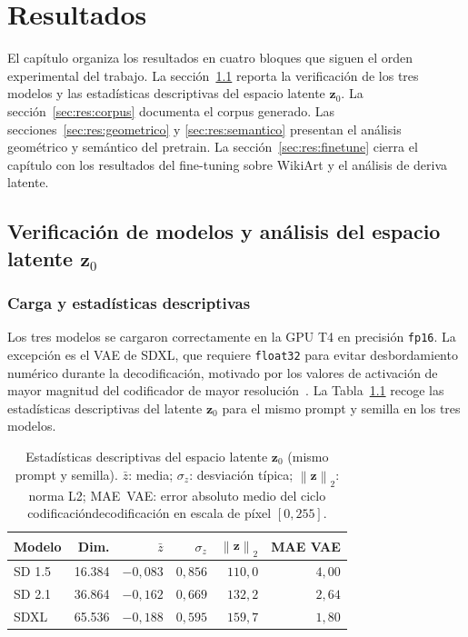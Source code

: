 \documentclass[12pt, a4paper, twoside]{book}
\newcommand{\z}{\mathbf{z}}
\newcommand{\norm}[1]{\left\|#1\right\|_2}
\begin{document}
\mainmatter

\chapter{Resultados}
\label{ch:resultados}

El capítulo organiza los resultados en cuatro bloques que siguen el orden experimental del trabajo.
La sección~\ref{sec:res:modelos} reporta la verificación de los tres modelos y las estadísticas
descriptivas del espacio latente $\z_0$. La sección~\ref{sec:res:corpus} documenta el corpus
generado. Las secciones~\ref{sec:res:geometrico} y \ref{sec:res:semantico} presentan el análisis
geométrico y semántico del pretrain. La sección~\ref{sec:res:finetune} cierra el capítulo con los
resultados del fine-tuning sobre WikiArt y el análisis de deriva latente.

\section{Verificación de modelos y análisis del espacio latente $\z_0$}
\label{sec:res:modelos}

\subsection{Carga y estadísticas descriptivas}

Los tres modelos se cargaron correctamente en la GPU T4 en precisión \texttt{fp16}.
La excepción es el VAE de SDXL, que requiere \texttt{float32} para evitar desbordamiento
numérico durante la decodificación, motivado por los valores de activación de mayor magnitud
del codificador de mayor resolución~\citep{podell2023sdxl}.
La Tabla~\ref{tab:estadisticas_z0} recoge las estadísticas descriptivas del latente $\z_0$
para el mismo prompt y semilla en los tres modelos.

\begin{table}[htb]
\centering
\caption{Estadísticas descriptivas del espacio latente $\z_0$ (mismo prompt y semilla).
$\bar{z}$: media; $\sigma_z$: desviación típica; $\norm{\z}$: norma L2; MAE~VAE: error
absoluto medio del ciclo codificación\textrightarrow{}decodificación en escala de píxel $[0,255]$.}
\label{tab:estadisticas_z0}
\small
\begin{tabular}{lrrrrr}
\toprule
\textbf{Modelo} & \textbf{Dim.} & $\bar{z}$ & $\sigma_z$ & $\norm{\z}$ & \textbf{MAE VAE} \\
\midrule
SD 1.5 & 16.384 & $-0{,}083$ & $0{,}856$ & $110{,}0$ & $4{,}00$ \\
SD 2.1 & 36.864 & $-0{,}162$ & $0{,}669$ & $132{,}2$ & $2{,}64$ \\
SDXL   & 65.536 & $-0{,}188$ & $0{,}595$ & $159{,}7$ & $1{,}80$ \\
\bottomrule
\end{tabular}
\end{table}
\end{document}
